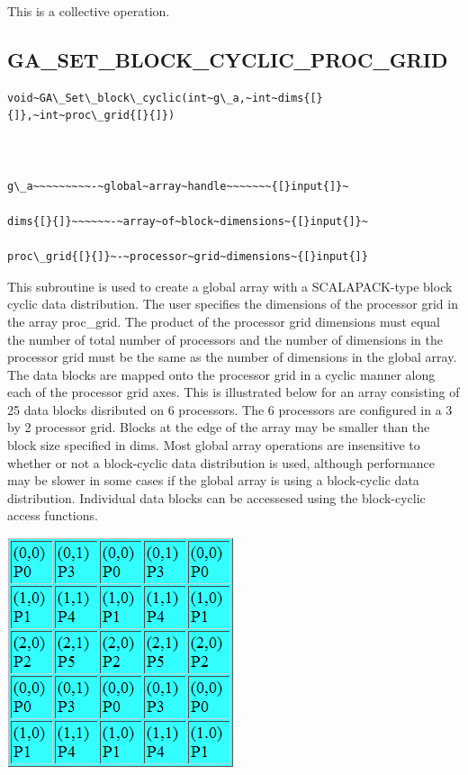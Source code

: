 This is a collective operation. 


\subsection*{\label{sub:GA_SET_BLOCK_CYCLIC_PROC_GRID}GA\_SET\_BLOCK\_CYCLIC\_PROC\_GRID}
\begin{verbatim}
void~GA\_Set\_block\_cyclic(int~g\_a,~int~dims{[}{]},~int~proc\_grid{[}{]})



g\_a~~~~~~~~~-~global~array~handle~~~~~~~{[}input{]}~

dims{[}{]}~~~~~~-~array~of~block~dimensions~{[}input{]}~

proc\_grid{[}{]}~-~processor~grid~dimensions~{[}input{]}
\end{verbatim}
This subroutine is used to create a global array with a SCALAPACK-type
block cyclic data distribution. The user specifies the dimensions
of the processor grid in the array proc\_grid. The product of the
processor grid dimensions must equal the number of total number of
processors and the number of dimensions in the processor grid must
be the same as the number of dimensions in the global array. The data
blocks are mapped onto the processor grid in a cyclic manner along
each of the processor grid axes. This is illustrated below for an
array consisting of 25 data blocks disributed on 6 processors. The
6 processors are configured in a 3 by 2 processor grid. Blocks at
the edge of the array may be smaller than the block size specified
in dims. Most global array operations are insensitive to whether or
not a block-cyclic data distribution is used, although performance
may be slower in some cases if the global array is using a block-cyclic
data distribution. Individual data blocks can be accessesed using
the block-cyclic access functions.

\includegraphics{Set_Block_Cyclic_Proc_Grid}

